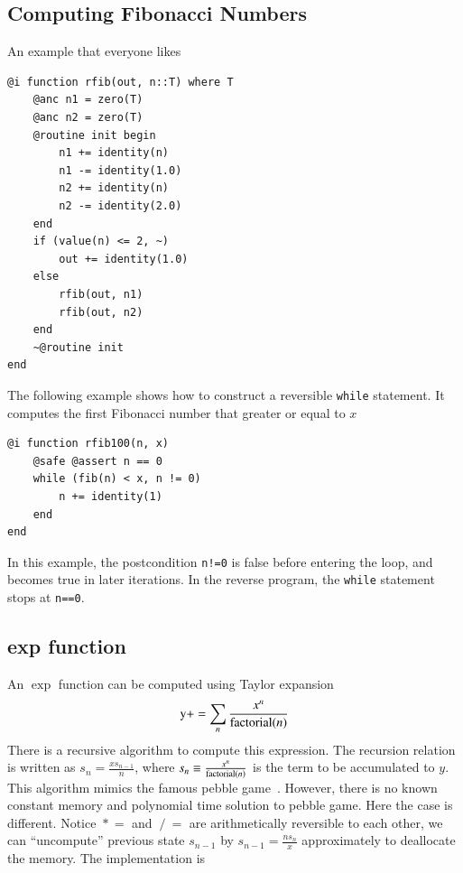 \documentclass[aps,twocolumn,longbibliography,english,superscriptaddress]{revtex4-1}
\newcommand{\<}{\langle}
\renewcommand{\>}{\rangle}
\theoremstyle{definition}\newtheorem{definition}{\textit{Definition}}
\begin{document}
\subsection{Computing Fibonacci Numbers}\label{sec:fib}
An example that everyone likes

\begin{minipage}{.44\textwidth}
\begin{lstlisting}
@i function rfib(out, n::T) where T
    @anc n1 = zero(T)
    @anc n2 = zero(T)
    @routine init begin
        n1 += identity(n)
        n1 -= identity(1.0)
        n2 += identity(n)
        n2 -= identity(2.0)
    end
    if (value(n) <= 2, ~)
        out += identity(1.0)
    else
        rfib(out, n1)
        rfib(out, n2)
    end
    ~@routine init
end
\end{lstlisting}
\end{minipage}

The following example shows how to construct a reversible \texttt{while} statement. It computes the first Fibonacci number that greater or equal to $x$

\begin{minipage}{.44\textwidth}
\begin{lstlisting}
@i function rfib100(n, x)
    @safe @assert n == 0
    while (fib(n) < x, n != 0)
        n += identity(1)
    end
end
\end{lstlisting}
\end{minipage}

In this example, the postcondition \texttt{n!=0} is false before entering the loop, and becomes true in later iterations. In the reverse program, the \texttt{while} statement stops at \texttt{n==0}.

\subsection{exp function}\label{sec:exp}
An $\exp$ function can be computed using Taylor expansion
\begin{equation}
    {\rm y} += \sum\limits_n \frac{x^n}{{\rm factorial}(n)}
\end{equation}
There is a recursive algorithm to compute this expression.
The recursion relation is written as $s_n = \frac{x s_{n-1}}{n}$, where $s_{n} \equiv \frac{x^n}{{\rm factorial}(n)}$ is the term to be accumulated to $y$.
This algorithm mimics the famous pebble game~\cite{Perumalla2013}. However, there is no known constant memory and polynomial time solution to pebble game.
Here the case is different. Notice $\mathrel{*}=$ and $\mathrel{/}=$ are arithmetically reversible to each other, we can ``uncompute'' previous state $s_{n-1}$ by $s_{n-1} = \frac{n s_n}{x}$ approximately to deallocate the memory.
The implementation is
\end{document}
